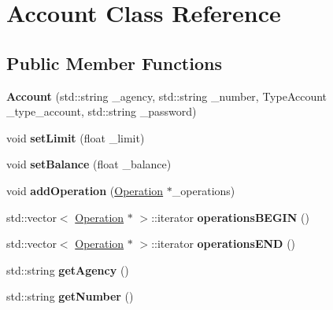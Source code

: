 \hypertarget{classAccount}{}\section{Account Class Reference}
\label{classAccount}
\subsection*{Public Member Functions}
\begin{DoxyCompactItemize}
\item 
\mbox{\label{classAccount_a3869a254c393605babed6f3027fc4b79}} 
{\bfseries Account} (std\+::string \+\_\+agency, std\+::string \+\_\+number, Type\+Account \+\_\+type\+\_\+account, std\+::string \+\_\+password)
\item 
\mbox{\label{classAccount_a82632554b95fe252b4f245739bac8d27}} 
void {\bfseries set\+Limit} (float \+\_\+limit)
\item 
\mbox{\label{classAccount_a1f341640de88d628019530b70b1b9431}} 
void {\bfseries set\+Balance} (float \+\_\+balance)
\item 
\mbox{\label{classAccount_a48071ecda1ec46aebce5f8379d346528}} 
void {\bfseries add\+Operation} (\hyperlink{classOperation}{Operation} $\ast$\+\_\+operations)
\item 
\mbox{\label{classAccount_a732975b513ba454378ca1c91942b23ba}} 
std\+::vector$<$ \hyperlink{classOperation}{Operation} $\ast$ $>$\+::iterator {\bfseries operations\+B\+E\+G\+IN} ()
\item 
\mbox{\label{classAccount_a3f499b3a04b88756d0a2542898155218}} 
std\+::vector$<$ \hyperlink{classOperation}{Operation} $\ast$ $>$\+::iterator {\bfseries operations\+E\+ND} ()
\item 
\mbox{\label{classAccount_a6da81204de964b2097469ee5ff904603}} 
std\+::string {\bfseries get\+Agency} ()
\item 
\mbox{\label{classAccount_a829e1a323877c6d99cfa327f4515a2c4}} 
std\+::string {\bfseries get\+Number} ()
\item 
\mbox{\label{classAccount_aa810a2202edd55c76649fb66d3348416}} 

\end{DoxyCompactItemize}
